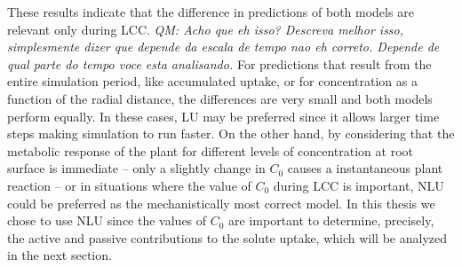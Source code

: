 


These results indicate that the difference in predictions of both models are relevant only {\tred during LCC. {\it QM: Acho que eh isso? Descreva melhor isso, simplesmente dizer que depende da escala de tempo nao eh correto. Depende de qual parte do tempo voce esta analisando.}} 
For predictions that result from the entire simulation period, like accumulated uptake, or for concentration as a function of the radial distance, the differences are very small and both models perform equally. 
In these cases, LU may be preferred since it allows larger time steps making simulation to run faster.
On the other hand, by considering that the metabolic response of the plant for different levels of concentration at root surface is immediate -- only a slightly change in $C_0$ causes a instantaneous plant reaction -- or in situations where the value of $C_0$ during LCC is important, NLU could be preferred as the mechanistically most correct model.  
In this thesis we chose to use NLU since the values of $C_0$ are important to determine, precisely, the active and passive contributions to the solute uptake, which will be analyzed in the next section.


